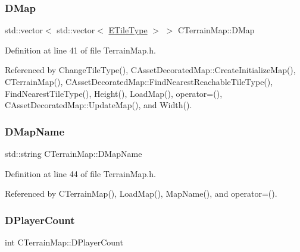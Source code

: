 \subsubsection{\texorpdfstring{D\+Map}{DMap}}
{\footnotesize\ttfamily std\+::vector$<$ std\+::vector$<$ \hyperlink{classCTerrainMap_aff2ab991e237269941416dd79d8871d4}{E\+Tile\+Type} $>$ $>$ C\+Terrain\+Map\+::\+D\+Map\hspace{0.3cm}{\ttfamily [protected]}}



Definition at line 41 of file Terrain\+Map.\+h.



Referenced by Change\+Tile\+Type(), C\+Asset\+Decorated\+Map\+::\+Create\+Initialize\+Map(), C\+Terrain\+Map(), C\+Asset\+Decorated\+Map\+::\+Find\+Nearest\+Reachable\+Tile\+Type(), Find\+Nearest\+Tile\+Type(), Height(), Load\+Map(), operator=(), C\+Asset\+Decorated\+Map\+::\+Update\+Map(), and Width().

\hypertarget{classCTerrainMap_a9026e4a5f073885b9e9fc3b43e93caa6}{}\label{classCTerrainMap_a9026e4a5f073885b9e9fc3b43e93caa6} 
\subsubsection{\texorpdfstring{D\+Map\+Name}{DMapName}}
{\footnotesize\ttfamily std\+::string C\+Terrain\+Map\+::\+D\+Map\+Name\hspace{0.3cm}{\ttfamily [protected]}}



Definition at line 44 of file Terrain\+Map.\+h.



Referenced by C\+Terrain\+Map(), Load\+Map(), Map\+Name(), and operator=().

\hypertarget{classCTerrainMap_a79e2cf566ac9dfbaddd2c73ea256785b}{}\label{classCTerrainMap_a79e2cf566ac9dfbaddd2c73ea256785b} 
\subsubsection{\texorpdfstring{D\+Player\+Count}{DPlayerCount}}
{\footnotesize\ttfamily int C\+Terrain\+Map\+::\+D\+Player\+Count\hspace{0.3cm}{\ttfamily [protected]}}



